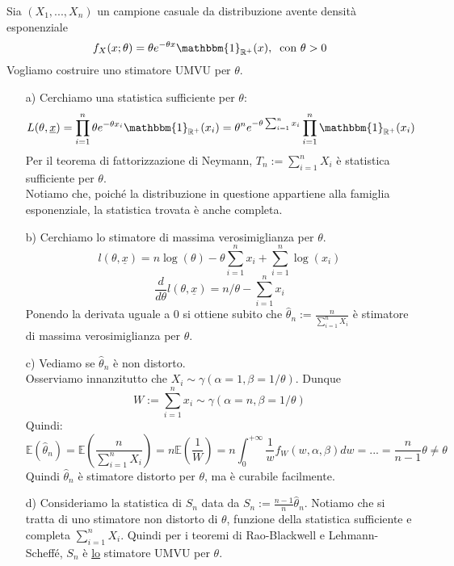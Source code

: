 \begin{esempio}[riassuntivo]

Sia $(X_1,...,X_n)$ un campione casuale da distribuzione avente densità esponenziale
$$f_X(x;\theta)=\theta e^{-\theta x} \mathbbm{1}_{\mathbb{R}^+}(x), \; \; \text{con } \theta>0$$
Vogliamo costruire uno stimatore UMVU per $\theta$.

\begin{enumerate}
\item[a)] Cerchiamo una statistica sufficiente per $\theta$:
$$L(	\theta,\underline{x}) = \prod_{i=1}^n \theta e^{-\theta x_i} \mathbbm{1}_{\mathbb{R}^+}(x_i) = \theta^n e^{-\theta \sum_{i=1}^n x_i} \prod_{i=1}^n \mathbbm{1}_{\mathbb{R}^+}(x_i)$$
Per il teorema di fattorizzazione di Neymann, $T_n:=\sum_{i=1}^n X_i$ è statistica sufficiente per $\theta$.\\
Notiamo che, poiché la distribuzione in questione appartiene alla famiglia esponenziale, la statistica trovata è anche completa.
\item[b)] Cerchiamo lo stimatore di massima verosimiglianza per $\theta$.
$$l(\theta, \underline{x}) = n \log(\theta) - \theta \sum_{i=1}^n x_i + \sum_{i=1}^n \log(x_i)$$
$$\frac{d}{d\theta} l(\theta,\underline{x}) = n/\theta - \sum_{i=1}^n x_i$$
Ponendo la derivata uguale a 0 si ottiene subito che $\hat{\theta}_n := \frac{n}{\sum_{i=1}^n X_i}$ è stimatore di massima verosimiglianza per $\theta$.
\item[c)] Vediamo se $\hat{\theta}_n$ è non distorto.\\
Osserviamo innanzitutto che $X_i \sim \gamma(\alpha=1, \beta=1/\theta)$. Dunque 
$$W:=\sum_{i=1}^n x_i \sim \gamma(\alpha=n, \beta=1/\theta)$$ Quindi:
$$\mathbb{E}(\hat{\theta}_n) = \mathbb{E}\left(\frac{n}{\sum_{i=1}^n X_i}\right) = n \mathbb{E}\left(\frac{1}{W}\right) = n \int_0^{+\infty} \frac{1}{w} f_W(w,\alpha,\beta) dw = ... = \frac{n}{n-1} \theta \neq \theta$$
Quindi $\hat{\theta}_n$ è stimatore distorto per $\theta$, ma è curabile facilmente.
\item[d)] Consideriamo la statistica di $S_n$ data da $S_n:=\frac{n-1}{n} \hat{\theta}_n$. Notiamo che si tratta di uno stimatore non distorto di $\theta$, funzione della statistica sufficiente e completa $\sum_{i=1}^n X_i$. Quindi per i teoremi di Rao-Blackwell e Lehmann-Scheffé, $S_n$ è \underline{lo} stimatore UMVU per $\theta$.
\end{enumerate}
\end{esempio}

